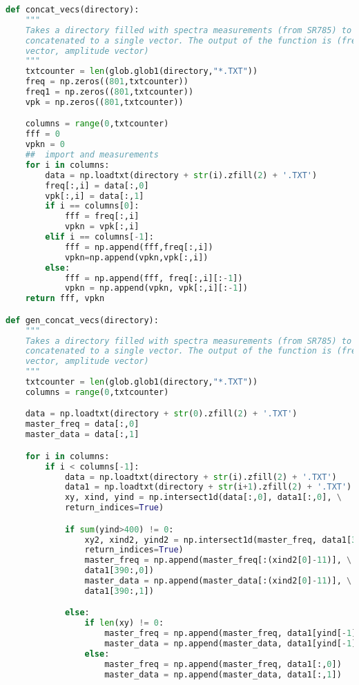 \begin{lstlisting}[frame=single, language=Python]
def concat_vecs(directory):
    """
    Takes a directory filled with spectra measurements (from SR785) to be
    concatenated to a single vector. The output of the function is (frequency
    vector, amplitude vector)
    """
    txtcounter = len(glob.glob1(directory,"*.TXT"))
    freq = np.zeros((801,txtcounter))
    freq1 = np.zeros((801,txtcounter))
    vpk = np.zeros((801,txtcounter))

    columns = range(0,txtcounter)
    fff = 0
    vpkn = 0
    ##  import and measurements
    for i in columns:
        data = np.loadtxt(directory + str(i).zfill(2) + '.TXT')
        freq[:,i] = data[:,0]
        vpk[:,i] = data[:,1]
        if i == columns[0]:
            fff = freq[:,i]
            vpkn = vpk[:,i]
        elif i == columns[-1]:
            fff = np.append(fff,freq[:,i])
            vpkn=np.append(vpkn,vpk[:,i])
        else:
            fff = np.append(fff, freq[:,i][:-1])
            vpkn = np.append(vpkn, vpk[:,i][:-1])
    return fff, vpkn

def gen_concat_vecs(directory):
    """
    Takes a directory filled with spectra measurements (from SR785) to be
    concatenated to a single vector. The output of the function is (frequency
    vector, amplitude vector)
    """
    txtcounter = len(glob.glob1(directory,"*.TXT"))
    columns = range(0,txtcounter)

    data = np.loadtxt(directory + str(0).zfill(2) + '.TXT')
    master_freq = data[:,0]
    master_data = data[:,1]

    for i in columns:
        if i < columns[-1]:
            data = np.loadtxt(directory + str(i).zfill(2) + '.TXT')
            data1 = np.loadtxt(directory + str(i+1).zfill(2) + '.TXT')
            xy, xind, yind = np.intersect1d(data[:,0], data1[:,0], \
            return_indices=True)

            if sum(yind>400) != 0:
                xy2, xind2, yind2 = np.intersect1d(master_freq, data1[390:,0],\
                return_indices=True)
                master_freq = np.append(master_freq[:(xind2[0]-11)], \
                data1[390:,0])
                master_data = np.append(master_data[:(xind2[0]-11)], \
                data1[390:,1])

            else:
                if len(xy) != 0:
                    master_freq = np.append(master_freq, data1[yind[-1]+1:,0])
                    master_data = np.append(master_data, data1[yind[-1]+1:,1])
                else:
                    master_freq = np.append(master_freq, data1[:,0])
                    master_data = np.append(master_data, data1[:,1])


\end{lstlisting}

